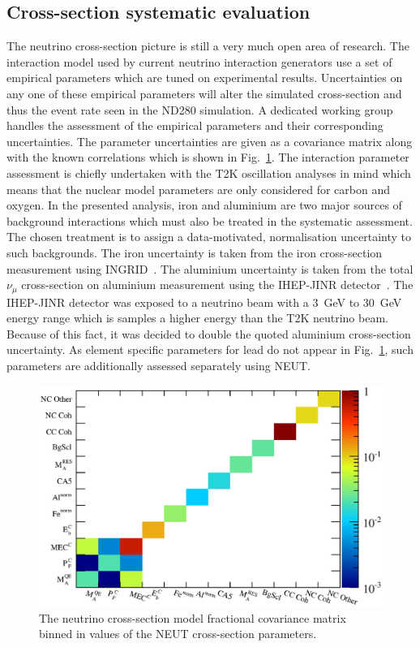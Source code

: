 \subsection{Cross-section systematic evaluation}
\label{subsec:CrossSectionSystematic}
The neutrino cross-section picture is still a very much open area of research.  The interaction model used by current neutrino interaction generators use a set of empirical parameters which are tuned on experimental results.  Uncertainties on any one of these empirical parameters will alter the simulated cross-section and thus the event rate seen in the ND280 simulation.  A dedicated working group handles the assessment of the empirical parameters and their corresponding uncertainties.  The parameter uncertainties are given as a covariance matrix along with the known correlations which is shown in Fig.~\ref{fig:XSecPredictionSyst}.  The interaction parameter assessment is chiefly undertaken with the T2K oscillation analyses in mind which means that the nuclear model parameters are only considered for carbon and oxygen.  In the presented analysis, iron and aluminium are two major sources of background interactions which must also be treated in the systematic assessment.  The chosen treatment is to assign a data-motivated, normalisation uncertainty to such backgrounds.  The iron uncertainty is taken from the iron cross-section measurement using INGRID~\cite{PhysRevD.90.052010}.  The aluminium uncertainty is taken from the total $\nu_\mu$ cross-section on aluminium measurement using the IHEP-JINR detector~\cite{Anikeev:1995dj}.  The IHEP-JINR detector was exposed to a neutrino beam with a 3~GeV to 30~GeV energy range which is samples a higher energy than the T2K neutrino beam.  Because of this fact, it was decided to double the quoted aluminium cross-section uncertainty.  As element specific parameters for lead do not appear in Fig.~\ref{fig:XSecPredictionSyst}, such parameters are additionally assessed separately using NEUT.
\begin{figure}
  \centering
  \includegraphics[width=12cm]{images/measurement/systematics/xsec/xsec_prediction_syst.eps}
  \caption{The neutrino cross-section model fractional covariance matrix binned in values of the NEUT cross-section parameters.}
  \label{fig:XSecPredictionSyst}
\end{figure}
